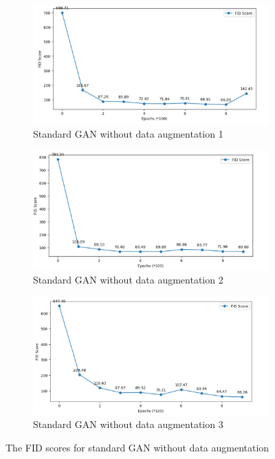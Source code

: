 \begin{figure}[H]
    \centering
    \begin{subfigure}[b]{\linewidth}
        \centering
        \includegraphics[width=0.8\linewidth]{./Images/standard_GAN_without_data_augementation1.jpg}
        \caption{Standard GAN without data augmentation 1}
        \label{fig:Dense}
    \end{subfigure}
    \vspace{0.05\linewidth} 
    \begin{subfigure}[b]{\linewidth}
        \centering
        \includegraphics[width=0.8\linewidth]{./Images/standard_GAN_without_data_augementation2.jpg}
        \caption{Standard GAN without data augmentation 2}
        \label{fig:Conv2DTranspose}
    \end{subfigure}
    \begin{subfigure}[b]{\linewidth}
        \centering
        \includegraphics[width=0.8\linewidth]{./Images/standard_GAN_without_data_augementation3.jpg}
        \caption{Standard GAN without data augmentation 3}
        \label{fig:Conv2DTranspose}
    \end{subfigure}
    \caption{The FID scores for standard GAN without data augmentation}
    \label{fig:combined}
\end{figure}


